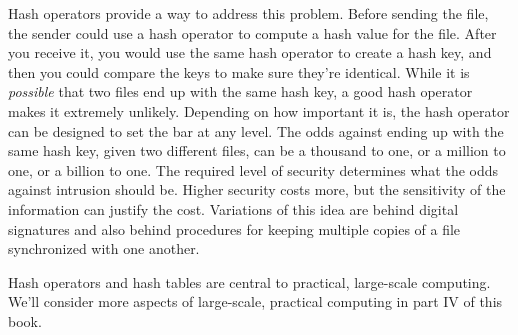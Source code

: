 Hash operators provide a way to address this problem.
Before sending the file, the sender could use a hash operator to compute a hash
value for the file. After you receive it, you would use the same hash operator
to create a hash key, and then you could compare the keys to make sure
they're identical. While it is \emph{possible} that two files end up with the
same hash key, a good hash operator makes it extremely unlikely.
Depending on how important it is, the hash operator can be designed to set
the bar at any level. The odds against
ending up with the same hash key, given two different files, can be
a thousand to one, or a million to one, or a billion to one.
The required level of security
determines what the odds against intrusion should be. Higher security
costs more, but the sensitivity of the information can justify the cost.
Variations of this idea are behind digital signatures and
also behind procedures for
keeping multiple copies of a file synchronized with one another.

Hash operators and hash tables are central to practical, large-scale computing.
We'll consider more aspects of large-scale, practical computing
in part IV of this book.

